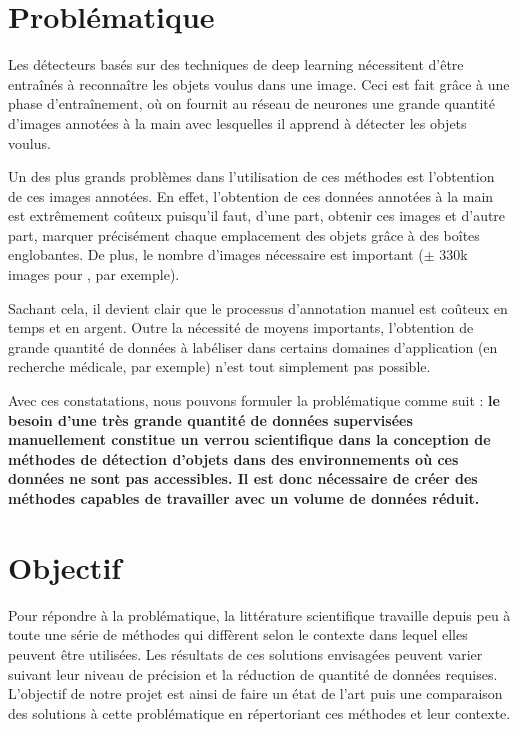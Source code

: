 \section{Problématique}
Les détecteurs basés sur des techniques de deep learning nécessitent d'être entraînés à reconnaître les objets voulus dans une image. Ceci est fait grâce à une phase d'entraînement, où on fournit au réseau de neurones une grande quantité d'images annotées à la main avec lesquelles il apprend à détecter les objets voulus. 

Un des plus grands problèmes dans l'utilisation de ces méthodes est l'obtention de ces images annotées. En effet, l'obtention de ces données annotées à la main est extrêmement coûteux puisqu'il faut, d'une part, obtenir ces images et d'autre part, marquer précisément chaque emplacement des objets grâce à des boîtes englobantes. De plus, le nombre d'images nécessaire est important ($\pm$ 330k images pour \cite{Lin_2014}, par exemple).

Sachant cela, il devient clair que le processus d'annotation manuel est coûteux en temps et en argent. Outre la nécessité de moyens importants, l'obtention de grande quantité de données à labéliser dans certains domaines d'application (en recherche médicale, par exemple) n'est tout simplement pas possible.

Avec ces constatations, nous pouvons formuler la problématique comme suit : \textbf{le besoin d'une très grande quantité de données supervisées manuellement constitue un verrou scientifique dans la conception de méthodes de détection d'objets dans des environnements où ces données ne sont pas accessibles. Il est donc nécessaire de créer des méthodes capables de travailler avec un volume de données réduit.}

\section{Objectif}
Pour répondre à la problématique, la littérature scientifique travaille depuis peu à toute une série de méthodes qui diffèrent selon le contexte dans lequel elles peuvent être utilisées. Les résultats de ces solutions envisagées peuvent varier suivant leur niveau de précision et la réduction de quantité de données requises. L'objectif de notre projet est ainsi de faire un état de l'art puis une comparaison des solutions à cette problématique en répertoriant ces méthodes et leur contexte.
